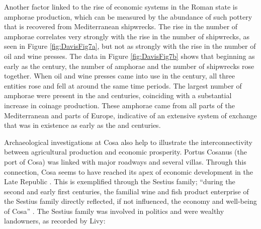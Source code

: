 





Another factor linked to the rise of economic systems in the Roman state is amphorae production, which can be measured by the abundance of such pottery that is recovered from Mediterranean shipwrecks. The rise in the number of amphorae correlates very strongly with the rise in the number of shipwrecks, as seen in Figure \ref{fig:DavisFig7a}, but not as strongly with the rise in the number of oil and wine presses. The data in Figure \ref{fig:DavisFig7b} shows that beginning as early as the  century\BC, the number of amphorae and the number of shipwrecks rose together. When oil and wine 
presses came into use in the  century\BC, all three entities rose and fell at around the same time periods. The largest number of amphorae were present in the  and  centuries\BC, coinciding with a substantial increase in coinage production. These amphorae came from all parts of the Mediterranean and parts of Europe, indicative of an extensive system of exchange that was in existence as early as the  and  centuries\BC.




Archaeological investigations at Cosa also help to illustrate the interconnectivity between agricultural production and economic prosperity. 
Portus Cosanus (the port of Cosa) was linked with major roadways and several villas. Through this connection, Cosa seems to have reached its apex of economic development in the Late Republic \parencite[124]{Manacorda_1978}. This is exemplified through the Sestius family; “during the second and early first centuries\BC, the familial wine and fish product enterprise of the Sestius family directly reflected, if not influenced, the economy and well-being of Cosa” \parencite[15]{Moore_1995}. 
The Sestius family was involved in politics and were wealthy landowners, as recorded by Livy:



